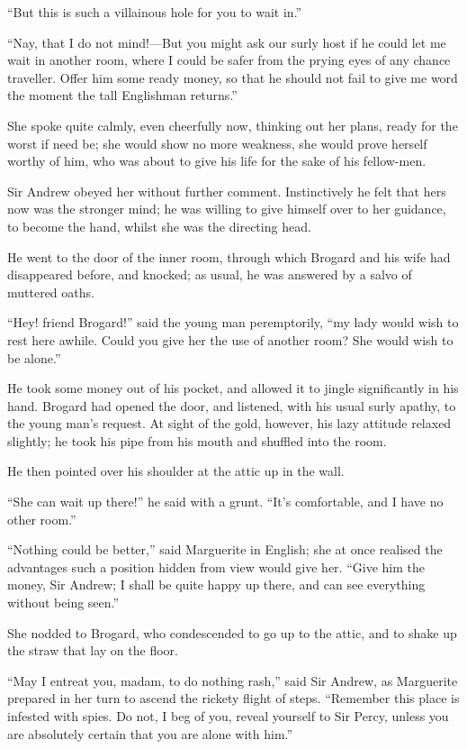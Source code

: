 \documentclass[paper=a5,BCOR=7mm,twoside,DIV=calc,12pt,usegeometry,chapterprefix,endperiod,headings=big]{scrbook}
\begin{document}
\enquote{But this is such a villainous hole for you to wait in.}

\enquote{Nay, that I do not mind!---But you might ask our surly host if he could let me wait in another room, where I could be safer from the prying eyes of any chance traveller. Offer him some ready money, so that he should not fail to give me word the moment the tall Englishman returns.}

She spoke quite calmly, even cheerfully now, thinking out her plans, ready for the worst if need be; she would show no more weakness, she would prove herself worthy of him, who was about to give his life for the sake of his fellow-men.

Sir Andrew obeyed her without further comment. Instinctively he felt that hers now was the stronger mind; he was willing to give himself over to her guidance, to become the hand, whilst she was the directing head.

He went to the door of the inner room, through which Brogard and his wife had disappeared before, and knocked; as usual, he was answered by a salvo of muttered oaths.

\enquote{Hey! friend Brogard!} said the young man peremptorily, \enquote{my lady would wish to rest here awhile. Could you give her the use of another room? She would wish to be alone.}

He took some money out of his pocket, and allowed it to jingle significantly in his hand. Brogard had opened the door, and listened, with his usual surly apathy, to the young man's request. At sight of the gold, however, his lazy attitude relaxed slightly; he took his pipe from his mouth and shuffled into the room.

He then pointed over his shoulder at the attic up in the wall.

\enquote{She can wait up there!} he said with a grunt. \enquote{It's comfortable, and I have no other room.}

\enquote{Nothing could be better,} said Marguerite in English; she at once realised the advantages such a position hidden from view would give her. \enquote{Give him the money, Sir Andrew; I shall be quite happy up there, and can see everything without being seen.}

She nodded to Brogard, who condescended to go up to the attic, and to shake up the straw that lay on the floor.

\enquote{May I entreat you, madam, to do nothing rash,} said Sir Andrew, as Marguerite prepared in her turn to ascend the rickety flight of steps. \enquote{Remember this place is infested with spies. Do not, I beg of you, reveal yourself to Sir Percy, unless you are absolutely certain that you are alone with him.}
\end{document}
